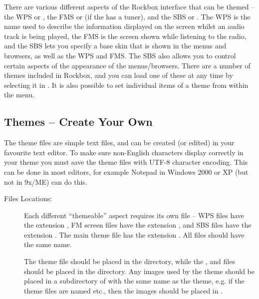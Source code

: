   There are various different aspects of the Rockbox interface
  that can be themed -- the WPS or , the FMS or
   (if the \dap{} has a tuner), and the SBS or
  . The WPS is the name used to
  describe the information displayed on the \daps{} screen whilst an audio
  track is being played, the FMS is the screen shown while listening to the
  radio, and the SBS lets you specify a base skin that is shown in the
  menus and browsers, as well as the WPS and FMS. The SBS also allows you to
  control certain aspects of the appearance of the menus/browsers.
  There are a number of themes included in Rockbox, and
  you can load one of these at any time by selecting it in
  .
  It is also possible to set individual items of a theme from within the
   menu.


\subsection{\label{ref:CreateYourOwnWPS}Themes -- Create Your Own}
The theme files are simple text files, and can be created (or edited) in your
favourite text editor. To make sure non-English characters
display correctly in your theme you must save the theme files with UTF-8
character encoding. This can be done in most editors, for example Notepad in
Windows 2000 or XP (but not in 9x/ME) can do this.

\begin{description}
\item [Files Locations: ] Each different ``themeable'' aspect requires its own file --
  WPS files have the extension , FM screen files have the extension
  , and SBS files have the extension . The main theme
  file has the extension . All files should have the same name.

  The theme  file should be placed in the 
  directory, while the ,  and  files should
  be placed in the  directory. Any images used by the
  theme should be placed in a subdirectory of  with the
  same name as the theme, e.g. if the theme files are named
   etc., then the images should be placed in
  .
\end{description}

